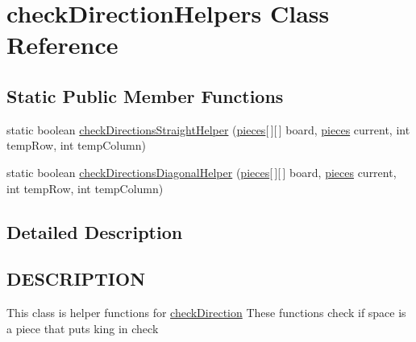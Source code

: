 \hypertarget{classcheckDirectionHelpers}{\section{check\-Direction\-Helpers Class Reference}
\label{classcheckDirectionHelpers}
}
\subsection*{Static Public Member Functions}
\begin{DoxyCompactItemize}
\item 
static boolean \hyperlink{classcheckDirectionHelpers_a8ef5c562966fec3e91481deb70e9614e}{check\-Directions\-Straight\-Helper} (\hyperlink{classpieces}{pieces}\mbox{[}$\,$\mbox{]}\mbox{[}$\,$\mbox{]} board, \hyperlink{classpieces}{pieces} current, int temp\-Row, int temp\-Column)
\item 
static boolean \hyperlink{classcheckDirectionHelpers_ae70944ef7cfbfcf227ce835c2ebf7138}{check\-Directions\-Diagonal\-Helper} (\hyperlink{classpieces}{pieces}\mbox{[}$\,$\mbox{]}\mbox{[}$\,$\mbox{]} board, \hyperlink{classpieces}{pieces} current, int temp\-Row, int temp\-Column)
\end{DoxyCompactItemize}


\subsection{Detailed Description}
\hypertarget{classvalidMoveTest_DESCRIPTION}{}\subsection{D\-E\-S\-C\-R\-I\-P\-T\-I\-O\-N}\label{classvalidMoveTest_DESCRIPTION}
This class is helper functions for \hyperlink{classcheckDirection}{check\-Direction} These functions check if space is a piece that puts king in check 

